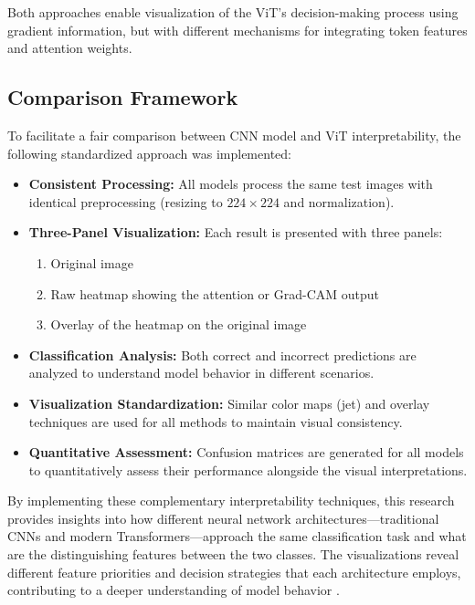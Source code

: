 \documentclass[a4paper,12pt]{report}
\begin{document}
Both approaches enable visualization of the ViT's decision-making process using gradient information, but with different mechanisms for integrating token features and attention weights.

\subsection{Comparison Framework}

To facilitate a fair comparison between CNN model and ViT interpretability, the following standardized approach was implemented:

\begin{itemize}
\item \textbf{Consistent Processing:} All models process the same test images with identical preprocessing (resizing to $224 \times 224$ and normalization).
\item \textbf{Three-Panel Visualization:} Each result is presented with three panels:
\begin{enumerate}
\item Original image
\item Raw heatmap showing the attention or Grad-CAM output
\item Overlay of the heatmap on the original image
\end{enumerate}
\item \textbf{Classification Analysis:} Both correct and incorrect predictions are analyzed to understand model behavior in different scenarios.
\item \textbf{Visualization Standardization:} Similar color maps (jet) and overlay techniques are used for all methods to maintain visual consistency.
\item \textbf{Quantitative Assessment:} Confusion matrices are generated for all models to quantitatively assess their performance alongside the visual interpretations.
\end{itemize}

By implementing these complementary interpretability techniques, this research provides insights into how different neural network architectures—traditional CNNs and modern Transformers—approach the same classification task and what are the distinguishing features between the two classes. The visualizations reveal different feature priorities and decision strategies that each architecture employs, contributing to a deeper understanding of model behavior \cite{dosovitskiy2021imageworth16x16words}.
\end{document}
